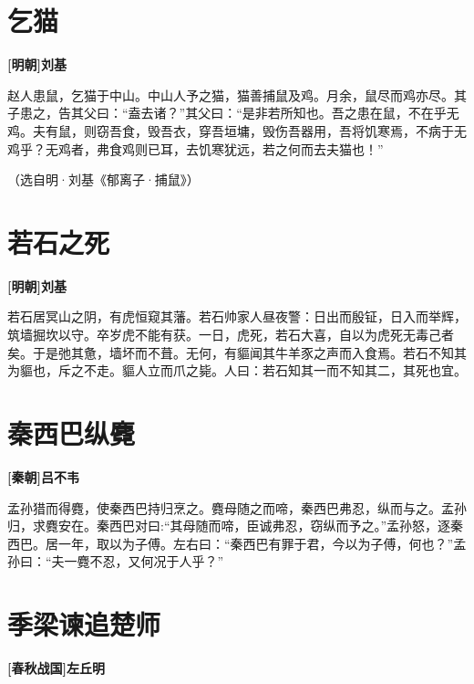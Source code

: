 \documentclass[UTF8,titlepage,oneside]{ctexbook}
\begin{document}
\chapter*{乞猫}
\begin{center}
	\textbf{[明朝]刘基}
\end{center}


赵人患鼠，乞猫于中山。中山人予之猫，猫善捕鼠及鸡。月余，鼠尽而鸡亦尽。其子患之，告其父曰：“盍去诸？”其父曰：“是非若所知也。吾之患在鼠，不在乎无鸡。夫有鼠，则窃吾食，毁吾衣，穿吾垣墉，毁伤吾器用，吾将饥寒焉，不病于无鸡乎？无鸡者，弗食鸡则已耳，去饥寒犹远，若之何而去夫猫也！”


（选自明·刘基《郁离子·捕鼠》）



\chapter*{若石之死}
\begin{center}
	\textbf{[明朝]刘基}
\end{center}


若石居冥山之阴，有虎恒窥其藩。若石帅家人昼夜警：日出而殷钲，日入而举辉，筑墙掘坎以守。卒岁虎不能有获。一日，虎死，若石大喜，自以为虎死无毒己者矣。于是弛其惫，墙坏而不葺。无何，有貙闻其牛羊豕之声而入食焉。若石不知其为貙也，斥之不走。貙人立而爪之毙。人曰：若石知其一而不知其二，其死也宜。

\chapter*{秦西巴纵麑}
\begin{center}
	\textbf{[秦朝]吕不韦}
\end{center}


孟孙猎而得麑，使秦西巴持归烹之。麑母随之而啼，秦西巴弗忍，纵而与之。孟孙归，求麑安在。秦西巴对曰:“其母随而啼，臣诚弗忍，窃纵而予之。”孟孙怒，逐秦西巴。居一年，取以为子傅。左右曰：“秦西巴有罪于君，今以为子傅，何也？”孟孙曰：“夫一麑不忍，又何况于人乎？”

\chapter*{季梁谏追楚师}
\begin{center}
	\textbf{[春秋战国]左丘明}
\end{center}
\end{document}
